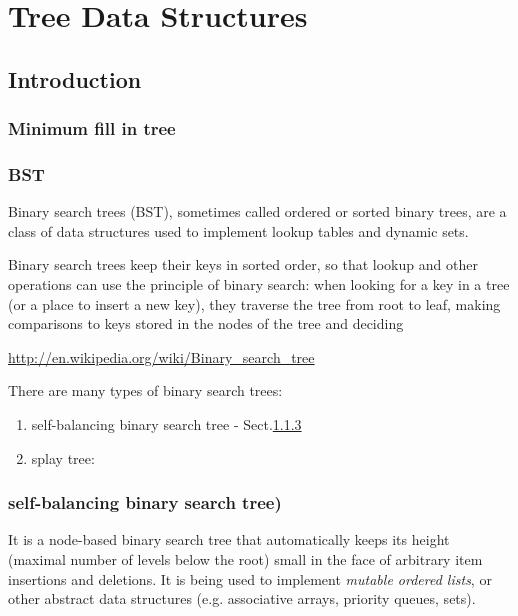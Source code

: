 \chapter{Tree Data Structures}
\label{chap:Tree_DataStructure}

\section{Introduction}

\subsection{Minimum fill in tree}


\subsection{BST}

Binary search trees (BST), sometimes called ordered or sorted binary trees, are
a class of data structures used to implement lookup tables and dynamic sets.

Binary search trees keep their keys in sorted order, so that lookup and other
operations can use the principle of binary search: when looking for a key in a
tree (or a place to insert a new key), they traverse the tree from root to leaf,
making comparisons to keys stored in the nodes of the tree and deciding

\url{http://en.wikipedia.org/wiki/Binary_search_tree}

There are many types of binary search trees:
\begin{enumerate}
  \item self-balancing binary search tree - Sect.\ref{sec:self_balancing-binary-search-tree}
  \item splay tree: 
\end{enumerate}

\subsection{self-balancing binary search tree)}
\label{sec:self_balancing-binary-search-tree}

It is a node-based binary search tree that automatically keeps its height
(maximal number of levels below the root) small in the face of arbitrary item
insertions and deletions. It is being used to implement {\it mutable ordered
lists}, or other abstract data structures (e.g. associative arrays, priority
queues, sets).

